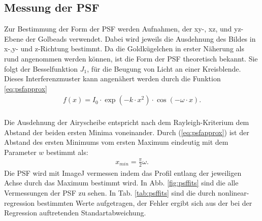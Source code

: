 \subsection{Messung der PSF}
Zur Bestimmung der Form der PSF werden Aufnahmen, der xy-, xz, und yz-Ebene der Golbeads verwendet. 
Dabei wird jeweils die Ausdehnung des Bildes in x-,y- und z-Richtung bestimmt.
Da die Goldkügelchen in erster Näherung als rund angenommen werden können, ist die Form der PSF theoretisch bekannt.
Sie folgt der Besselfunktion $J_1$, für die Beugung von Licht an einer Kreisblende.
Dieses Interferenzmuster kann angenähert werden durch die Funktion \ref{eq:psfapprox}
\begin{align}
	f(x)=I_0 \cdot \exp \left( -k \cdot x^2 \right) \cdot \cos \left(-\omega\cdot x\right). \label{eq:psfapprox}
\end{align}
\\ 
Die Ausdehnung der Airyscheibe entspricht nach dem Rayleigh-Kriterium dem Abstand der beiden ersten Minima voneinander. 
Durch (\ref{eq:psfapprox}) ist der Abstand des ersten Minimums vom ersten Maximum eindeutig mit dem Parameter $w$ bestimmt als:
\begin{align}
x_{min} = \frac{\pi}{2}\omega.
\end{align}
Die PSF wird mit ImageJ vermessen indem das Profil entlang der jeweiligen Achse durch das Maximum bestimmt wird.
In Abb. \ref{fig:psffits} sind die alle Vermessungen der PSF zu sehen. In Tab. \ref{tab:psffits} sind die durch nonlinear-regression bestimmten Werte aufgetragen, der Fehler ergibt sich aus der bei der Regression auftretenden Standartabweichung.
